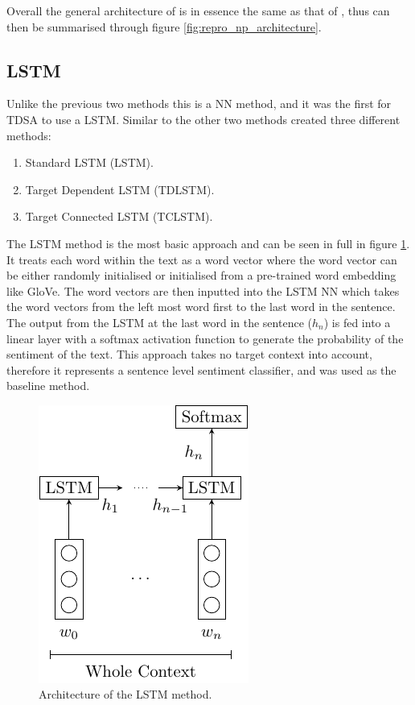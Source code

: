 Overall the general architecture of \citet{wang-etal-2017-tdparse} is in essence the same as that of \citet{vo2015target}, thus can then be summarised through figure \ref{fig:repro_np_architecture}. 

\subsection{LSTM}
\label{section:repro_lstm_description}
Unlike the previous two methods this is a NN method, and it was the first for TDSA to use a LSTM. Similar to the other two methods \citet{tang-etal-2016-effective} created three different methods: 

\begin{enumerate}
    \item Standard LSTM (LSTM).
    \item Target Dependent LSTM (TDLSTM).
    \item Target Connected LSTM (TCLSTM).
\end{enumerate}

The LSTM method is the most basic approach and can be seen in full in figure \ref{fig:repro_lstm_method}. It treats each word within the text as a word vector where the word vector can be either randomly initialised or initialised from a pre-trained word embedding like GloVe. The word vectors are then inputted into the LSTM NN which takes the word vectors from the left most word first to the last word in the sentence. The output from the LSTM at the last word in the sentence ($h_n$) is fed into a linear layer with a softmax activation function to generate the probability of the sentiment of the text. This approach takes no target context into account, therefore it represents a sentence level sentiment classifier, and was used as the baseline method.

\begin{figure}[!h]
    \centering
    \includegraphics{Diagrams/Reproducibility/tang_lstm.pdf}
    \caption{Architecture of the LSTM method.}
    \label{fig:repro_lstm_method}
\end{figure}

